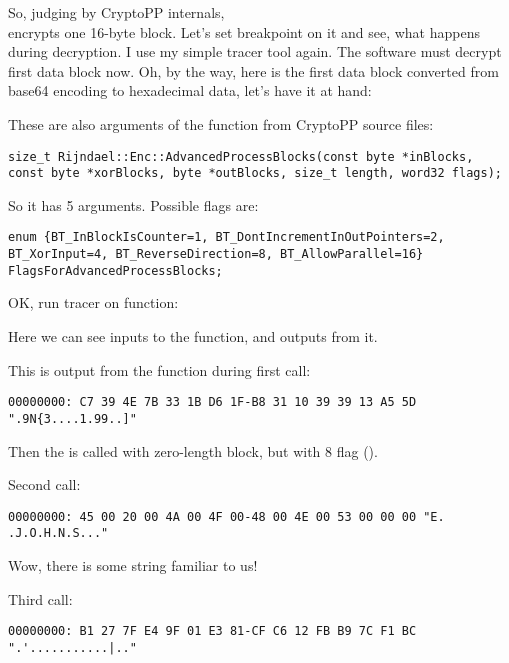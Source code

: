So, judging by CryptoPP internals, \\
 encrypts one 16-byte block.
Let's set breakpoint on it and see, what happens during decryption.
I use my simple tracer tool again.
The software must decrypt first data block now.
Oh, by the way, here is the first data block converted from base64 encoding to hexadecimal data,
let's have it at hand:



These are also arguments of the function from CryptoPP source files:

\begin{lstlisting}
size_t Rijndael::Enc::AdvancedProcessBlocks(const byte *inBlocks, const byte *xorBlocks, byte *outBlocks, size_t length, word32 flags);
\end{lstlisting}

So it has 5 arguments. Possible flags are:

\begin{lstlisting}
enum {BT_InBlockIsCounter=1, BT_DontIncrementInOutPointers=2, BT_XorInput=4, BT_ReverseDirection=8, BT_AllowParallel=16} FlagsForAdvancedProcessBlocks;
\end{lstlisting}

OK, run tracer on  function:



Here we can see inputs to the  function, and outputs from it.

This is output from the function during first call:

\begin{lstlisting}
00000000: C7 39 4E 7B 33 1B D6 1F-B8 31 10 39 39 13 A5 5D ".9N{3....1.99..]"
\end{lstlisting}

Then the  is called with zero-length block, but with 8 flag ().

Second call:

\begin{lstlisting}
00000000: 45 00 20 00 4A 00 4F 00-48 00 4E 00 53 00 00 00 "E. .J.O.H.N.S..."
\end{lstlisting}

Wow, there is some string familiar to us!

Third call:

\begin{lstlisting}
00000000: B1 27 7F E4 9F 01 E3 81-CF C6 12 FB B9 7C F1 BC ".'...........|.."
\end{lstlisting}

